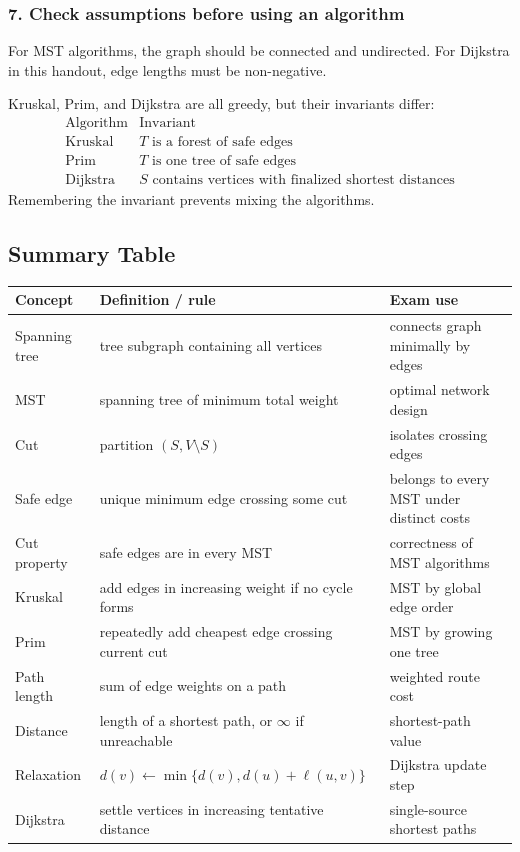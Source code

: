 \subsubsection*{7. Check assumptions before using an algorithm}
For MST algorithms, the graph should be connected and undirected. For Dijkstra in this handout, edge lengths must be non-negative.

\begin{extension}[title={Unified greedy viewpoint}]
Kruskal, Prim, and Dijkstra are all greedy, but their invariants differ:
\[
\begin{array}{c|c}
\text{Algorithm} & \text{Invariant} \\ \hline
\text{Kruskal} & T\text{ is a forest of safe edges} \\
\text{Prim} & T\text{ is one tree of safe edges} \\
\text{Dijkstra} & S\text{ contains vertices with finalized shortest distances}
\end{array}
\]
Remembering the invariant prevents mixing the algorithms.
\end{extension}

\subsection{Summary Table}

\begin{center}
\small
\begin{tabular}{@{}p{}p{}p{}@{}}
\toprule
\textbf{Concept} & \textbf{Definition / rule} & \textbf{Exam use} \\
\midrule
Spanning tree & tree subgraph containing all vertices & connects graph minimally by edges \\
MST & spanning tree of minimum total weight & optimal network design \\
Cut & partition \((S,V\setminus S)\) & isolates crossing edges \\
Safe edge & unique minimum edge crossing some cut & belongs to every MST under distinct costs \\
Cut property & safe edges are in every MST & correctness of MST algorithms \\
Kruskal & add edges in increasing weight if no cycle forms & MST by global edge order \\
Prim & repeatedly add cheapest edge crossing current cut & MST by growing one tree \\
Path length & sum of edge weights on a path & weighted route cost \\
Distance & length of a shortest path, or \(\infty\) if unreachable & shortest-path value \\
Relaxation & \(d(v)\leftarrow\min\{d(v),d(u)+\ell(u,v)\}\) & Dijkstra update step \\
Dijkstra & settle vertices in increasing tentative distance & single-source shortest paths \\
\bottomrule
\end{tabular}
\end{center}

